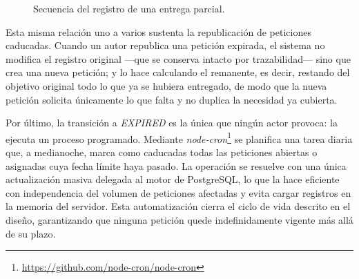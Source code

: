 \documentclass[11pt,oneside,spanish,listoffigures,listoftables]{tfgetsinf}
\begin{document}
\begin{figure}[htbp]
\centering
{}
\caption[Secuencia del registro de una entrega parcial]{Secuencia del registro de una entrega parcial.}
\label{fig:secuencia-fulfillment}
\end{figure}

Esta misma relación uno a varios sustenta la republicación de peticiones caducadas. Cuando un autor republica una petición expirada, el sistema no modifica el registro original —que se conserva intacto por trazabilidad— sino que crea una nueva petición; y lo hace calculando el remanente, es decir, restando del objetivo original todo lo que ya se hubiera entregado, de modo que la nueva petición solicita únicamente lo que falta y no duplica la necesidad ya cubierta.

Por último, la transición a \textit{EXPIRED} es la única que ningún actor provoca: la ejecuta un proceso programado. Mediante \textit{node-cron}\footnote{\url{https://github.com/node-cron/node-cron}} se planifica una tarea diaria que, a medianoche, marca como caducadas todas las peticiones abiertas o asignadas cuya fecha límite haya pasado. La operación se resuelve con una única actualización masiva delegada al motor de PostgreSQL, lo que la hace eficiente con independencia del volumen de peticiones afectadas y evita cargar registros en la memoria del servidor. Esta automatización cierra el ciclo de vida descrito en el diseño, garantizando que ninguna petición quede indefinidamente vigente más allá de su plazo.
\end{document}
